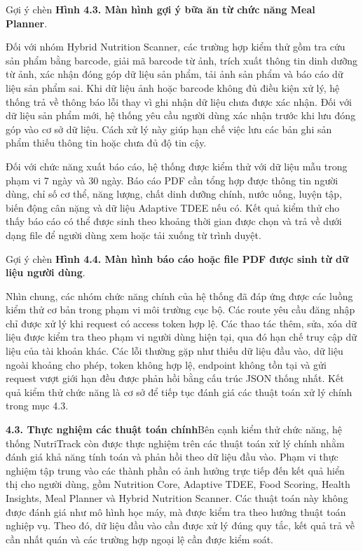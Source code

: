 Gợi ý chèn \textbf{Hình 4.3. Màn hình gợi ý bữa ăn từ chức năng Meal Planner}.

Đối với nhóm Hybrid Nutrition Scanner, các trường hợp kiểm thử gồm tra cứu sản phẩm bằng barcode, giải mã barcode từ ảnh, trích xuất thông tin dinh dưỡng từ ảnh, xác nhận đóng góp dữ liệu sản phẩm, tải ảnh sản phẩm và báo cáo dữ liệu sản phẩm sai. Khi dữ liệu ảnh hoặc barcode không đủ điều kiện xử lý, hệ thống trả về thông báo lỗi thay vì ghi nhận dữ liệu chưa được xác nhận. Đối với dữ liệu sản phẩm mới, hệ thống yêu cầu người dùng xác nhận trước khi lưu đóng góp vào cơ sở dữ liệu. Cách xử lý này giúp hạn chế việc lưu các bản ghi sản phẩm thiếu thông tin hoặc chưa đủ độ tin cậy.

Đối với chức năng xuất báo cáo, hệ thống được kiểm thử với dữ liệu mẫu trong phạm vi 7 ngày và 30 ngày. Báo cáo PDF cần tổng hợp được thông tin người dùng, chỉ số cơ thể, năng lượng, chất dinh dưỡng chính, nước uống, luyện tập, biến động cân nặng và dữ liệu Adaptive TDEE nếu có. Kết quả kiểm thử cho thấy báo cáo có thể được sinh theo khoảng thời gian được chọn và trả về dưới dạng file để người dùng xem hoặc tải xuống từ trình duyệt.

Gợi ý chèn \textbf{Hình 4.4. Màn hình báo cáo hoặc file PDF được sinh từ dữ liệu người dùng}.

Nhìn chung, các nhóm chức năng chính của hệ thống đã đáp ứng được các luồng kiểm thử cơ bản trong phạm vi môi trường cục bộ. Các route yêu cầu đăng nhập chỉ được xử lý khi request có access token hợp lệ. Các thao tác thêm, sửa, xóa dữ liệu được kiểm tra theo phạm vi người dùng hiện tại, qua đó hạn chế truy cập dữ liệu của tài khoản khác. Các lỗi thường gặp như thiếu dữ liệu đầu vào, dữ liệu ngoài khoảng cho phép, token không hợp lệ, endpoint không tồn tại và gửi request vượt giới hạn đều được phản hồi bằng cấu trúc JSON thống nhất. Kết quả kiểm thử chức năng là cơ sở để tiếp tục đánh giá các thuật toán xử lý chính trong mục 4.3.

\textbf{4.3. Thực nghiệm các thuật toán chính}Bên cạnh kiểm thử chức năng, hệ thống NutriTrack còn được thực nghiệm trên các thuật toán xử lý chính nhằm đánh giá khả năng tính toán và phản hồi theo dữ liệu đầu vào. Phạm vi thực nghiệm tập trung vào các thành phần có ảnh hưởng trực tiếp đến kết quả hiển thị cho người dùng, gồm Nutrition Core, Adaptive TDEE, Food Scoring, Health Insights, Meal Planner và Hybrid Nutrition Scanner. Các thuật toán này không được đánh giá như mô hình học máy, mà được kiểm tra theo hướng thuật toán nghiệp vụ. Theo đó, dữ liệu đầu vào cần được xử lý đúng quy tắc, kết quả trả về cần nhất quán và các trường hợp ngoại lệ cần được kiểm soát.

